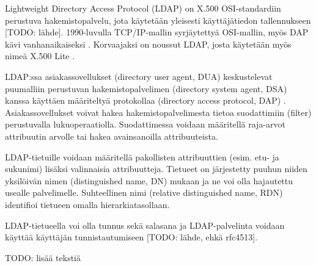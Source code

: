 Lightweight Directory Access Protocol (LDAP) on X.500 OSI-standardiin perustuva hakemistopalvelu, jota käytetään yleisesti käyttäjätiedon tallennukseen [TODO: lähde]. 1990-luvulla TCP/IP-mallin syrjäytettyä OSI-mallin, myös DAP kävi vanhanaikaiseksi \cite{howes}. Korvaajaksi on noussut LDAP, josta käytetään myös nimeä X.500 Lite \cite{howes}.

LDAP:ssa asiakassovellukset (directory user agent, DUA) keskustelevat puumalliin perustuvan hakemistopalvelimen (directory system agent, DSA) kanssa käyttäen määriteltyä protokollaa (directory access protocol, DAP) \cite{howes}. Asiakassovellukset voivat hakea hakemistopalvelimesta tietoa suodattimiin (filter) perustuvalla lukuoperaatiolla. Suodattimessa voidaan määritellä raja-arvot attribuutin arvolle tai hakea avainsanoilla attribuuteista.

LDAP-tietuille voidaan määritellä pakollisten attribuuttien (esim. etu- ja sukunimi) lisäksi valinnaisia attribuutteja. Tietueet on järjestetty puuhun niiden yksilöivän nimen (distinguished name, DN) mukaan ja ne voi olla hajautettu usealle palvelimelle. Suhteellinen nimi (relative distinguished name, RDN) identifioi tietueen omalla hierarkiatasollaan.

LDAP-tietueella voi olla tunnus sekä salasana ja LDAP-palvelinta voidaan käyttää käyttäjän tunnistautumiseen [TODO: lähde, ehkä rfc4513].

TODO: lisää tekstiä
